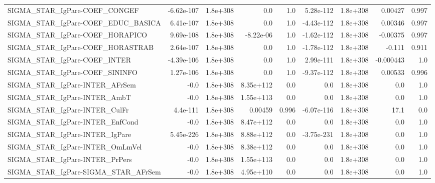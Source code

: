 \begin{tabular}{lrrrrrrrr}
SIGMA\_STAR\_IgPare-COEF\_CONGEF         &  -6.62e-107 &     1.8e+308 &        0.0 &      1.0 &  5.28e-112 &    1.8e+308 &      0.00427 &         0.997 \\
SIGMA\_STAR\_IgPare-COEF\_EDUC\_BASICA    &   6.41e-107 &     1.8e+308 &        0.0 &      1.0 & -4.43e-112 &    1.8e+308 &      0.00346 &         0.997 \\
SIGMA\_STAR\_IgPare-COEF\_HORAPICO       &   9.69e-108 &     1.8e+308 &  -8.22e-06 &      1.0 & -1.62e-112 &    1.8e+308 &     -0.00375 &         0.997 \\
SIGMA\_STAR\_IgPare-COEF\_HORASTRAB      &   2.64e-107 &     1.8e+308 &        0.0 &      1.0 & -1.78e-112 &    1.8e+308 &       -0.111 &         0.911 \\
SIGMA\_STAR\_IgPare-COEF\_INTER          &  -4.39e-106 &     1.8e+308 &        0.0 &      1.0 &  2.99e-111 &    1.8e+308 &    -0.000443 &           1.0 \\
SIGMA\_STAR\_IgPare-COEF\_SININFO        &   1.27e-106 &     1.8e+308 &        0.0 &      1.0 & -9.37e-112 &    1.8e+308 &      0.00533 &         0.996 \\
SIGMA\_STAR\_IgPare-INTER\_AFrSem        &        -0.0 &     1.8e+308 &  8.35e+112 &      0.0 &        0.0 &    1.8e+308 &          0.0 &           1.0 \\
SIGMA\_STAR\_IgPare-INTER\_AmbT          &        -0.0 &     1.8e+308 &  1.55e+113 &      0.0 &        0.0 &    1.8e+308 &          0.0 &           1.0 \\
SIGMA\_STAR\_IgPare-INTER\_CulFr         &    4.4e-111 &     1.8e+308 &    0.00459 &    0.996 & -6.07e-116 &    1.8e+308 &         17.1 &           0.0 \\
SIGMA\_STAR\_IgPare-INTER\_EnfCond       &        -0.0 &     1.8e+308 &  8.47e+112 &      0.0 &        0.0 &    1.8e+308 &          0.0 &           1.0 \\
SIGMA\_STAR\_IgPare-INTER\_IgPare        &   5.45e-226 &     1.8e+308 &  8.88e+112 &      0.0 & -3.75e-231 &    1.8e+308 &          0.0 &           1.0 \\
SIGMA\_STAR\_IgPare-INTER\_OmLmVel       &        -0.0 &     1.8e+308 &  8.38e+112 &      0.0 &        0.0 &    1.8e+308 &          0.0 &           1.0 \\
SIGMA\_STAR\_IgPare-INTER\_PrPers        &        -0.0 &     1.8e+308 &  1.55e+113 &      0.0 &        0.0 &    1.8e+308 &          0.0 &           1.0 \\
SIGMA\_STAR\_IgPare-SIGMA\_STAR\_AFrSem   &        -0.0 &     1.8e+308 &  4.95e+110 &      0.0 &        0.0 &    1.8e+308 &          0.0 &           1.0 \\

\end{tabular}
